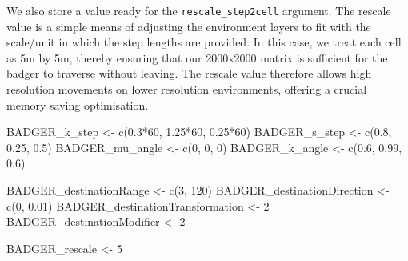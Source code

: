 \documentclass[10pt,a4paper]{article}
\newenvironment{Shaded}{}{}
\newcommand{\DecValTok}[1]{#1}
\newcommand{\FloatTok}[1]{#1}
\newcommand{\FunctionTok}[1]{#1}
\newcommand{\NormalTok}[1]{#1}
\newcommand{\OtherTok}[1]{#1}
\newcommand{\SpecialCharTok}[1]{#1}
\begin{document}
We also store a value ready for the \texttt{rescale\_step2cell} argument.
The rescale value is a simple means of adjusting the environment layers to fit with the scale/unit in which the step lengths are provided.
In this case, we treat each cell as 5m by 5m, thereby ensuring that our 2000x2000 matrix is sufficient for the badger to traverse without leaving.
The rescale value therefore allows high resolution movements on lower resolution environments, offering a crucial memory saving optimisation.

\begin{Shaded}
\begin{Highlighting}[]
\NormalTok{BADGER\_k\_step }\OtherTok{\textless{}{-}} \FunctionTok{c}\NormalTok{(}\FloatTok{0.3}\SpecialCharTok{*}\DecValTok{60}\NormalTok{, }\FloatTok{1.25}\SpecialCharTok{*}\DecValTok{60}\NormalTok{, }\FloatTok{0.25}\SpecialCharTok{*}\DecValTok{60}\NormalTok{)}
\NormalTok{BADGER\_s\_step }\OtherTok{\textless{}{-}} \FunctionTok{c}\NormalTok{(}\FloatTok{0.8}\NormalTok{, }\FloatTok{0.25}\NormalTok{, }\FloatTok{0.5}\NormalTok{)}
\NormalTok{BADGER\_mu\_angle }\OtherTok{\textless{}{-}} \FunctionTok{c}\NormalTok{(}\DecValTok{0}\NormalTok{, }\DecValTok{0}\NormalTok{, }\DecValTok{0}\NormalTok{)}
\NormalTok{BADGER\_k\_angle }\OtherTok{\textless{}{-}} \FunctionTok{c}\NormalTok{(}\FloatTok{0.6}\NormalTok{, }\FloatTok{0.99}\NormalTok{, }\FloatTok{0.6}\NormalTok{)}

\NormalTok{BADGER\_destinationRange }\OtherTok{\textless{}{-}} \FunctionTok{c}\NormalTok{(}\DecValTok{3}\NormalTok{, }\DecValTok{120}\NormalTok{)}
\NormalTok{BADGER\_destinationDirection }\OtherTok{\textless{}{-}} \FunctionTok{c}\NormalTok{(}\DecValTok{0}\NormalTok{, }\FloatTok{0.01}\NormalTok{)}
\NormalTok{BADGER\_destinationTransformation }\OtherTok{\textless{}{-}} \DecValTok{2}
\NormalTok{BADGER\_destinationModifier }\OtherTok{\textless{}{-}} \DecValTok{2}

\NormalTok{BADGER\_rescale }\OtherTok{\textless{}{-}} \DecValTok{5}
\end{Highlighting}
\end{Shaded}
\end{document}
